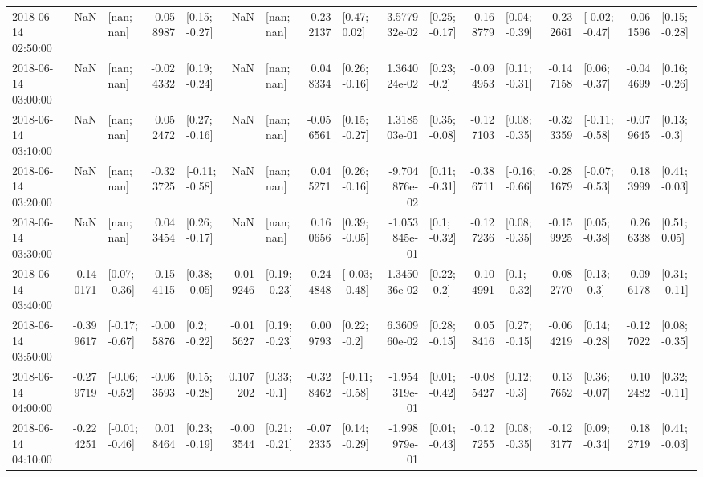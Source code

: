 \begin{tabular}{lrlrlrlrlrlrlrlrl}
2018-06-14 02:50:00 &       NaN &      [nan; nan] & -0.058987 &   [0.15; -0.27] &       NaN &      [nan; nan] &  0.232137 &    [0.47; 0.02] &  3.577932e-02 &   [0.25; -0.17] & -0.168779 &   [0.04; -0.39] & -0.232661 &  [-0.02; -0.47] & -0.061596 &   [0.15; -0.28] \\
2018-06-14 03:00:00 &       NaN &      [nan; nan] & -0.024332 &   [0.19; -0.24] &       NaN &      [nan; nan] &  0.048334 &   [0.26; -0.16] &  1.364024e-02 &    [0.23; -0.2] & -0.094953 &   [0.11; -0.31] & -0.147158 &   [0.06; -0.37] & -0.044699 &   [0.16; -0.26] \\
2018-06-14 03:10:00 &       NaN &      [nan; nan] &  0.052472 &   [0.27; -0.16] &       NaN &      [nan; nan] & -0.056561 &   [0.15; -0.27] &  1.318503e-01 &   [0.35; -0.08] & -0.127103 &   [0.08; -0.35] & -0.323359 &  [-0.11; -0.58] & -0.079645 &    [0.13; -0.3] \\
2018-06-14 03:20:00 &       NaN &      [nan; nan] & -0.323725 &  [-0.11; -0.58] &       NaN &      [nan; nan] &  0.045271 &   [0.26; -0.16] & -9.704876e-02 &   [0.11; -0.31] & -0.386711 &  [-0.16; -0.66] & -0.281679 &  [-0.07; -0.53] &  0.183999 &   [0.41; -0.03] \\
2018-06-14 03:30:00 &       NaN &      [nan; nan] &  0.043454 &   [0.26; -0.17] &       NaN &      [nan; nan] &  0.160656 &   [0.39; -0.05] & -1.053845e-01 &    [0.1; -0.32] & -0.127236 &   [0.08; -0.35] & -0.159925 &   [0.05; -0.38] &  0.266338 &    [0.51; 0.05] \\
2018-06-14 03:40:00 & -0.140171 &   [0.07; -0.36] &  0.154115 &   [0.38; -0.05] & -0.019246 &   [0.19; -0.23] & -0.244848 &  [-0.03; -0.48] &  1.345036e-02 &    [0.22; -0.2] & -0.104991 &    [0.1; -0.32] & -0.082770 &    [0.13; -0.3] &  0.096178 &   [0.31; -0.11] \\
2018-06-14 03:50:00 & -0.399617 &  [-0.17; -0.67] & -0.005876 &    [0.2; -0.22] & -0.015627 &   [0.19; -0.23] &  0.009793 &    [0.22; -0.2] &  6.360960e-02 &   [0.28; -0.15] &  0.058416 &   [0.27; -0.15] & -0.064219 &   [0.14; -0.28] & -0.127022 &   [0.08; -0.35] \\
2018-06-14 04:00:00 & -0.279719 &  [-0.06; -0.52] & -0.063593 &   [0.15; -0.28] &  0.107202 &    [0.33; -0.1] & -0.328462 &  [-0.11; -0.58] & -1.954319e-01 &   [0.01; -0.42] & -0.085427 &    [0.12; -0.3] &  0.137652 &   [0.36; -0.07] &  0.102482 &   [0.32; -0.11] \\
2018-06-14 04:10:00 & -0.224251 &  [-0.01; -0.46] &  0.018464 &   [0.23; -0.19] & -0.003544 &   [0.21; -0.21] & -0.072335 &   [0.14; -0.29] & -1.998979e-01 &   [0.01; -0.43] & -0.127255 &   [0.08; -0.35] & -0.123177 &   [0.09; -0.34] &  0.182719 &   [0.41; -0.03] \\

\end{tabular}
